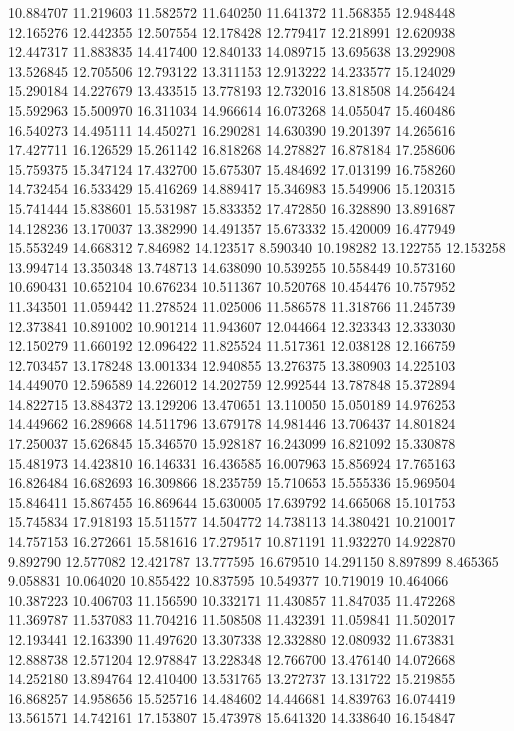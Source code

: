 10.884707
11.219603
11.582572
11.640250
11.641372
11.568355
12.948448
12.165276
12.442355
12.507554
12.178428
12.779417
12.218991
12.620938
12.447317
11.883835
14.417400
12.840133
14.089715
13.695638
13.292908
13.526845
12.705506
12.793122
13.311153
12.913222
14.233577
15.124029
15.290184
14.227679
13.433515
13.778193
12.732016
13.818508
14.256424
15.592963
15.500970
16.311034
14.966614
16.073268
14.055047
15.460486
16.540273
14.495111
14.450271
16.290281
14.630390
19.201397
14.265616
17.427711
16.126529
15.261142
16.818268
14.278827
16.878184
17.258606
15.759375
15.347124
17.432700
15.675307
15.484692
17.013199
16.758260
14.732454
16.533429
15.416269
14.889417
15.346983
15.549906
15.120315
15.741444
15.838601
15.531987
15.833352
17.472850
16.328890
13.891687
14.128236
13.170037
13.382990
14.491357
15.673332
15.420009
16.477949
15.553249
14.668312
7.846982
14.123517
8.590340
10.198282
13.122755
12.153258
13.994714
13.350348
13.748713
14.638090
10.539255
10.558449
10.573160
10.690431
10.652104
10.676234
10.511367
10.520768
10.454476
10.757952
11.343501
11.059442
11.278524
11.025006
11.586578
11.318766
11.245739
12.373841
10.891002
10.901214
11.943607
12.044664
12.323343
12.333030
12.150279
11.660192
12.096422
11.825524
11.517361
12.038128
12.166759
12.703457
13.178248
13.001334
12.940855
13.276375
13.380903
14.225103
14.449070
12.596589
14.226012
14.202759
12.992544
13.787848
15.372894
14.822715
13.884372
13.129206
13.470651
13.110050
15.050189
14.976253
14.449662
16.289668
14.511796
13.679178
14.981446
13.706437
14.801824
17.250037
15.626845
15.346570
15.928187
16.243099
16.821092
15.330878
15.481973
14.423810
16.146331
16.436585
16.007963
15.856924
17.765163
16.826484
16.682693
16.309866
18.235759
15.710653
15.555336
15.969504
15.846411
15.867455
16.869644
15.630005
17.639792
14.665068
15.101753
15.745834
17.918193
15.511577
14.504772
14.738113
14.380421
10.210017
14.757153
16.272661
15.581616
17.279517
10.871191
11.932270
14.922870
9.892790
12.577082
12.421787
13.777595
16.679510
14.291150
8.897899
8.465365
9.058831
10.064020
10.855422
10.837595
10.549377
10.719019
10.464066
10.387223
10.406703
11.156590
10.332171
11.430857
11.847035
11.472268
11.369787
11.537083
11.704216
11.508508
11.432391
11.059841
11.502017
12.193441
12.163390
11.497620
13.307338
12.332880
12.080932
11.673831
12.888738
12.571204
12.978847
13.228348
12.766700
13.476140
14.072668
14.252180
13.894764
12.410400
13.531765
13.272737
13.131722
15.219855
16.868257
14.958656
15.525716
14.484602
14.446681
14.839763
16.074419
13.561571
14.742161
17.153807
15.473978
15.641320
14.338640
16.154847
